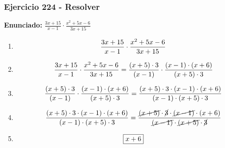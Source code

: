 \documentclass[11pt,a4paper]{article}
\newcommand{\fitmath}[1]{%
\[
\setbox0=\hbox{$\displaystyle #1$}%
\ifdim\wd0>\linewidth
\resizebox{\linewidth}{!}{$\displaystyle #1$}%
\else
#1%
\fi
\]
}
\begin{document}
\subsubsection*{Ejercicio 224 - Resolver}
\textbf{Enunciado:} $ \frac{3 x + 15}{x - 1} \cdot \frac{x^{2} + 5 x - 6}{3 x + 15} $\par
\begin{enumerate}[leftmargin=2em]
\item \fitmath{\frac{3 x + 15}{x - 1} \cdot \frac{x^{2} + 5 x - 6}{3 x + 15}}
\item \fitmath{\frac{3 x + 15}{x - 1} \cdot \frac{x^{2} + 5 x - 6}{3 x + 15}= \frac{\left(x + 5\right)\cdot 3}{\left(x - 1\right)} \cdot \frac{\left(x - 1\right)\cdot \left(x + 6\right)}{\left(x + 5\right)\cdot 3}}
\item \fitmath{\frac{\left(x + 5\right)\cdot 3}{\left(x - 1\right)}\cdot \frac{\left(x - 1\right)\cdot \left(x + 6\right)}{\left(x + 5\right)\cdot 3}= \frac{\left(x + 5\right)\cdot 3\cdot \left(x - 1\right)\cdot \left(x + 6\right)}{\left(x - 1\right)\cdot \left(x + 5\right)\cdot 3}}
\item \fitmath{\frac{\left(x + 5\right)\cdot 3\cdot \left(x - 1\right)\cdot \left(x + 6\right)}{\left(x - 1\right)\cdot \left(x + 5\right)\cdot 3}= \frac{\cancel{\left(x + 5\right)}\cdot \cancel{3}\cdot \cancel{\left(x - 1\right)}\cdot \left(x + 6\right)}{\cancel{\left(x - 1\right)}\cdot \cancel{\left(x + 5\right)}\cdot \cancel{3}}}
\item \fitmath{\boxed{x + 6}}
\end{enumerate}

\vspace{0.12cm}
\end{document}
